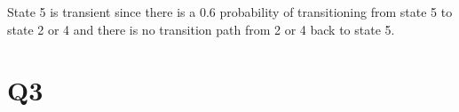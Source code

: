 \documentclass{article}
\begin{document}
                                                                                                                                                                                                                                                                                                                                                                                                                                                                                                                                                                                                                                                                                                                                                                                       

State 5 is transient since there is a 0.6 probability of transitioning from state 5 to state 2 or 4 and there is no transition path from 2 or 4 back to state 5.                                                                                                                                                                                                                                                                                                                                                                                                                                                                                                                                                                                                                                                                                                                                                                                                                                                                                                                                                                                                                                                                                                                                                                                                                                                                                                                                                                                                                                                                                                                                                                                                                                                                                                                                                                                                                                                                                                                                                                                                                                                                                        

\section*{Q3}
\end{document}
